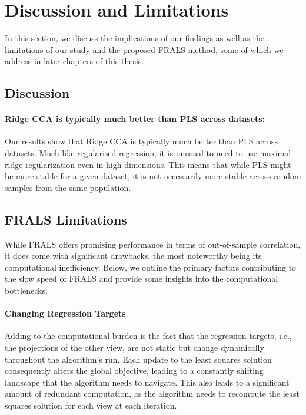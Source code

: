 \section{Discussion and Limitations}

In this section, we discuss the implications of our findings as well as the limitations of our study and the proposed FRALS method, some of which we address in later chapters of this thesis.

\subsection{Discussion}

\paragraph{Ridge CCA is typically much better than PLS across datasets:} Our results show that Ridge CCA is typically much better than PLS across datasets.
Much like regularised regression, it is unusual to need to use maximal ridge regularization even in high dimensions.
This means that while PLS might be more stable for a given dataset, it is not necessarily more stable across random samples from the same population.

\subsection{FRALS Limitations}
While FRALS offers promising performance in terms of out-of-sample correlation, it does come with significant drawbacks, the most noteworthy being its computational inefficiency.
Below, we outline the primary factors contributing to the slow speed of FRALS and provide some insights into the computational bottlenecks.

\paragraph{Changing Regression Targets}\label{subsec:changing-regression-targets}
Adding to the computational burden is the fact that the regression targets, i.e., the projections of the other view, are not static but change dynamically throughout the algorithm's run.
Each update to the least squares solution consequently alters the global objective, leading to a constantly shifting landscape that the algorithm needs to navigate.
This also leads to a significant amount of redundant computation, as the algorithm needs to recompute the least squares solution for each view at each iteration.

